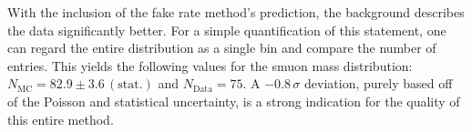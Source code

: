 With the inclusion of the fake rate method's prediction, the background describes the data significantly better. For a simple quantification of this statement, one can regard the entire distribution as a single bin and compare the number of entries. This yields the following values for the smuon mass distribution: $N_{\text{MC}} = 82.9 \pm 3.6\,(\text{stat.})$ and $N_{\text{Data}} = 75$. A $-0.8\,\sigma$ deviation, purely based off of the Poisson and statistical uncertainty, is a strong indication for the quality of this entire method.


